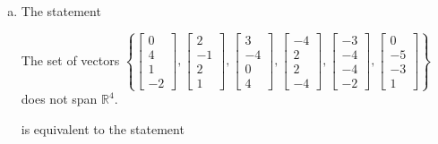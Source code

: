 \begin{exerciseAnswer}
\begin{enumerate}[(a)]
\item The statement 
\begin{center}\begin{minipage}{0.8\textwidth}
 The set of vectors \( \left\{ \left[\begin{array}{c}
0 \\
4 \\
1 \\
-2
\end{array}\right] , \left[\begin{array}{c}
2 \\
-1 \\
2 \\
1
\end{array}\right] , \left[\begin{array}{c}
3 \\
-4 \\
0 \\
4
\end{array}\right] , \left[\begin{array}{c}
-4 \\
2 \\
2 \\
-4
\end{array}\right] , \left[\begin{array}{c}
-3 \\
-4 \\
-4 \\
-2
\end{array}\right] , \left[\begin{array}{c}
0 \\
-5 \\
-3 \\
1
\end{array}\right] \right\} \) does not span \(\mathbb{R}^4\). 
\end{minipage}\end{center}
     is equivalent to the statement 
\begin{center}\begin{minipage}{0.8\textwidth}
 The vector equation \( x_{1} \left[\begin{array}{c}
0 \\
4 \\
1 \\
-2
\end{array}\right] + x_{2} \left[\begin{array}{c}
2 \\
-1 \\

\end{array}
\end{minipage}
\end{center}
\end{enumerate}
\end{exerciseAnswer}
